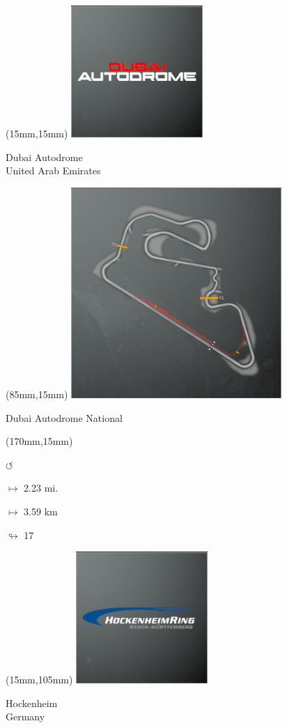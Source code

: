 \begin{textblock*}{60mm}(15mm,15mm)%
\includegraphics[width=50mm]{LG/2015-05-20_00081.png}
\par Dubai Autodrome\\ United Arab Emirates
\end{textblock*}
\begin{textblock*}{80mm}(85mm,15mm)%
\includegraphics[width=80mm]{TR/2015-05-20_00025.png}
\centerline{Dubai Autodrome National}
\end{textblock*}
\begin{textblock*}{30mm}(170mm,15mm)%
\par \Huge$\circlearrowleft$
\Large
\par$\mapsto$ 2.23 mi.
\par$\mapsto$ 3.59 km
\par$\looparrowright$ 17
\end{textblock*}
\begin{textblock*}{60mm}(15mm,105mm)%
\includegraphics[width=50mm]{LG/2015-05-20_00082.png}
\par Hockenheim\\ Germany
\end{textblock*}
